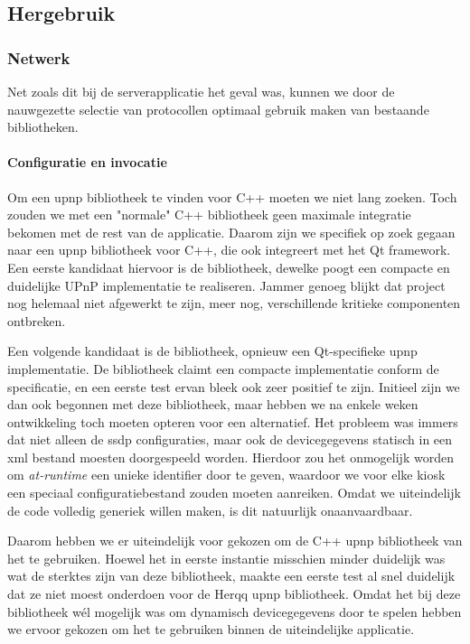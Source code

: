 \subsection{Hergebruik}

\subsubsection{Netwerk}

Net zoals dit bij de serverapplicatie het geval was, kunnen we door de nauwgezette selectie van protocollen optimaal gebruik maken van bestaande bibliotheken.

\paragraph{Configuratie en invocatie} Om een \ac{upnp} bibliotheek te vinden voor C++ moeten we niet lang zoeken. Toch zouden we met een "normale" C++ bibliotheek geen maximale integratie bekomen met de rest van de applicatie. Daarom zijn we specifiek op zoek gegaan naar een \ac{upnp} bibliotheek voor C++, die ook integreert met het Qt framework. Een eerste kandidaat hiervoor is de  bibliotheek, dewelke poogt een compacte en duidelijke UPnP implementatie te realiseren. Jammer genoeg blijkt dat project nog helemaal niet afgewerkt te zijn, meer nog, verschillende kritieke componenten ontbreken.

Een volgende kandidaat is de  bibliotheek, opnieuw een Qt-specifieke \ac{upnp} implementatie. De bibliotheek claimt een compacte implementatie conform de specificatie, en een eerste test ervan bleek ook zeer positief te zijn. Initieel zijn we dan ook begonnen met deze bibliotheek, maar hebben we na enkele weken ontwikkeling toch moeten opteren voor een alternatief. Het probleem was immers dat niet alleen de \ac{ssdp} configuraties, maar ook de devicegegevens statisch in een \ac{xml} bestand moesten doorgespeeld worden. Hierdoor zou het onmogelijk worden om \emph{at-runtime} een unieke identifier door te geven, waardoor we voor elke kiosk een speciaal configuratiebestand zouden moeten aanreiken. Omdat we uiteindelijk de code volledig generiek willen maken, is dit natuurlijk onaanvaardbaar.

Daarom hebben we er uiteindelijk voor gekozen om de C++ \ac{upnp} bibliotheek van het  te gebruiken. Hoewel het in eerste instantie misschien minder duidelijk was wat de sterktes zijn van deze bibliotheek, maakte een eerste test al snel duidelijk dat ze niet moest onderdoen voor de Herqq \ac{upnp} bibliotheek. Omdat het bij deze bibliotheek wél mogelijk was om dynamisch devicegegevens door te spelen hebben we ervoor gekozen om het te gebruiken binnen de uiteindelijke applicatie.


